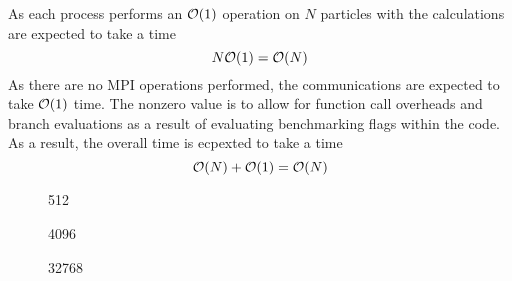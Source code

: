 %
As each process performs an $\mathcal{O}{\left({ 1 }\right)}$ operation on $N$ particles with
the calculations are expected to take a time
\begin{equation}
\label{eqn:v0_replicated_individual_operation_overall_time}
    N\mathcal{O}{\left({ 1 }\right)} = \mathcal{O}{\left({ N }\right)}
\end  {equation}
%
As there are no MPI operations performed, the communications are
expected to take $\mathcal{O}{\left({ 1 }\right)}$ time.
%
The nonzero value is to allow for function call overheads and
branch evaluations as a result of evaluating benchmarking flags
within the code.
%
As a result, the overall time is ecpexted to take a time
\begin{equation}
    \mathcal{O}{\left({ N }\right)} + \mathcal{O}{\left({ 1 }\right)} = \mathcal{O}{\left({ N }\right)}
\end{equation}


%
%
\begin{figure}[!h]
    
    \caption{
        \vZeroTimeCaption
            {\replicateddata{}}
            {\individualoperation{}}
            {512}
    }
    \label{fig:v0_replicated_individual_operation_512_time}
\end  {figure}

\begin{figure}[!h]
    
    \caption{
        \vZeroTimeCaption
            {\replicateddata{}}
            {\individualoperation{}}
            {4096}
    }
    \label{fig:v0_replicated_individual_operation_4096_time}
\end  {figure}

\begin{figure}[!h]
    
    \caption{
        \vZeroTimeCaption
            {\replicateddata{}}
            {\individualoperation{}}
            {32768}
    }
    \label{fig:v0_replicated_individual_operation_32768_time}
\end  {figure}


\vZeroTimeExplanation
    {}
    {}
    {}
    {\individualoperation{}}
    {\replicateddata{}}


